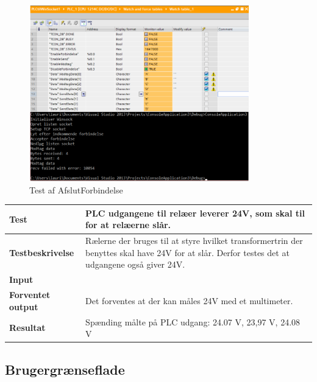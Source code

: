 \begin{figure}[H] %
	\centering
	\includegraphics[width=0.85\textwidth]{Test/ModultestStyringsenhed/AfslutForbindelse}
	\caption{Test af AfslutForbindelse}
	\label{fig:AfslutForbindelse}
\end{figure}

\begin{center}
	\begin{tabular}{ | m{} | m{}|} 
		\hline
		\textbf{Test}					&PLC udgangene til relæer leverer 24V, som skal til for at relæerne slår. \\ \hline
		\textbf{Testbeskrivelse}		&Rælerne der bruges til at styre hvilket transformertrin der benyttes skal have 24V for at slår. Derfor testes det at udgangene også giver 24V.\\ \hline
		\textbf{Input}					& \\ \hline
		\textbf{Forventet output}		&Det forventes at der kan måles 24V med et multimeter.\\ \hline
		\textbf{Resultat}				&Spænding målte på PLC udgang: 24.07 V, 23,97 V, 24.08 V   \\ \hline
	\end{tabular}
\end{center}

\subsection{Brugergrænseflade}

